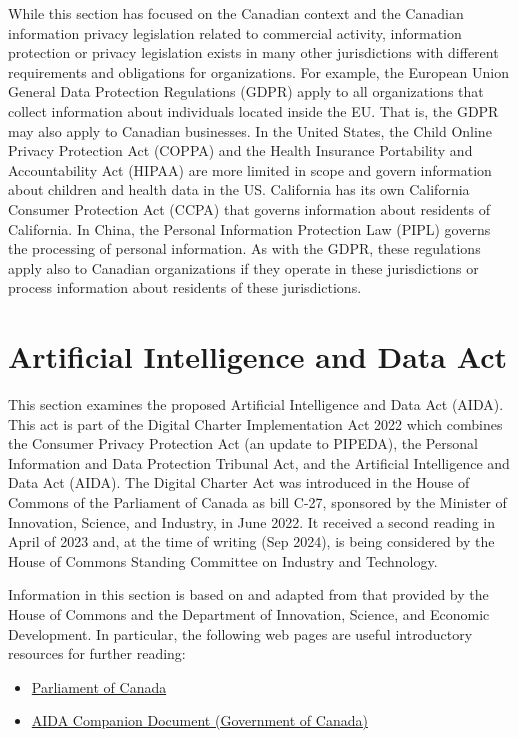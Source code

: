 While this section has focused on the Canadian context and the Canadian information privacy legislation related to commercial activity, information protection or privacy legislation exists in many other jurisdictions with different requirements and obligations for organizations. For example, the European Union General Data Protection Regulations (GDPR) apply to all organizations that collect information about individuals located inside the EU. That is, the GDPR may also apply to Canadian businesses. In the United States, the Child Online Privacy Protection Act (COPPA) and the Health Insurance Portability and Accountability Act (HIPAA) are more limited in scope and govern information about children and health data in the US. California has its own California Consumer Protection Act (CCPA) that governs information about residents of California. In China, the Personal Information Protection Law (PIPL) governs the processing of personal information. As with the GDPR, these regulations apply also to Canadian organizations if they operate in these jurisdictions or process information about residents of these jurisdictions.

\section{Artificial Intelligence and Data Act}

This section examines the proposed Artificial Intelligence and Data Act (AIDA). This act is part of the Digital Charter Implementation Act 2022 which combines the Consumer Privacy Protection Act (an update to PIPEDA), the Personal Information and Data Protection Tribunal Act, and the Artificial Intelligence and Data Act (AIDA). The Digital Charter Act was introduced in the House of Commons of the Parliament of Canada as bill C-27, sponsored by the Minister of Innovation, Science, and Industry, in June 2022. It received a second reading in April of 2023 and, at the time of writing (Sep 2024), is being considered by the House of Commons Standing Committee on Industry and Technology. 

\begin{resourcebox}

Information in this section is based on and adapted from that provided by the House of Commons and the Department of Innovation, Science, and Economic Development. In particular, the following web pages are useful introductory resources for further reading:
\begin{itemize}
\item \href{https://www.parl.ca/legisinfo/en/bill/44-1/c-27}{Parliament of Canada}
\item \href{https://ised-isde.canada.ca/site/innovation-better-canada/en/artificial-intelligence-and-data-act-aida-companion-document}{AIDA Companion Document (Government of Canada)}
\end{itemize}
\end{resourcebox}

